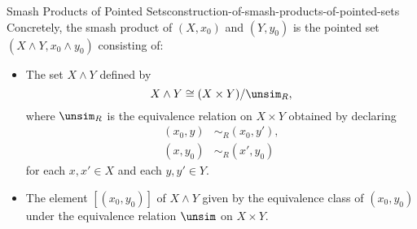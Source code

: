 \begin{construction}{Smash Products of Pointed Sets}{construction-of-smash-products-of-pointed-sets}%
    Concretely, the smash product of $(X,x_{0})$ and $(Y,y_{0})$ is the pointed set $(X\wedge Y,x_{0}\wedge y_{0})$ consisting of:%
    \begin{itemize}
        \item{}The set $X\wedge Y$ defined by
            \[
                X\wedge Y%
                \cong%
                (X\times Y)/\unsim_{R},%
            \]%
            where $\unsim_{R}$ is the equivalence relation on $X\times Y$ obtained by declaring
            \begin{align*}
                (x_{0},y) &\sim_{R} (x_{0},y'),\\
                (x,y_{0}) &\sim_{R} (x',y_{0})
            \end{align*}
            for each $x,x'\in X$ and each $y,y'\in Y$.
        \item{}The element $[(x_{0},y_{0})]$ of $X\wedge Y$ given by the equivalence class of $(x_{0},y_{0})$ under the equivalence relation $\unsim$ on $X\times Y$.
    \end{itemize}
\end{construction}
